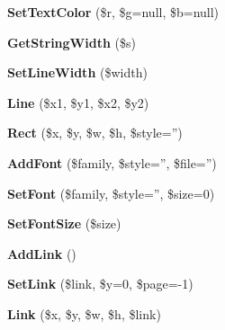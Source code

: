 \begin{DoxyCompactItemize}
\item 
\hypertarget{classFPDF_a59f12883ff2b60013eb0fe2c8c7e2dd5}{{\bfseries Set\+Text\+Color} (\$r, \$g=null, \$b=null)}\label{classFPDF_a59f12883ff2b60013eb0fe2c8c7e2dd5}

\item 
\hypertarget{classFPDF_a55c99f3416c3788c759249b6315c948a}{{\bfseries Get\+String\+Width} (\$s)}\label{classFPDF_a55c99f3416c3788c759249b6315c948a}

\item 
\hypertarget{classFPDF_ac8e8290a814b06303c1dfff06ee24acb}{{\bfseries Set\+Line\+Width} (\$width)}\label{classFPDF_ac8e8290a814b06303c1dfff06ee24acb}

\item 
\hypertarget{classFPDF_a408bfb653ed942e1e00d80ea9cdc139b}{{\bfseries Line} (\$x1, \$y1, \$x2, \$y2)}\label{classFPDF_a408bfb653ed942e1e00d80ea9cdc139b}

\item 
\hypertarget{classFPDF_af6b45f243c32ec04f1be28823b0cf15c}{{\bfseries Rect} (\$x, \$y, \$w, \$h, \$style='')}\label{classFPDF_af6b45f243c32ec04f1be28823b0cf15c}

\item 
\hypertarget{classFPDF_a7bfe3e0ed15ed966d8c41e36fb16553c}{{\bfseries Add\+Font} (\$family, \$style='', \$file='')}\label{classFPDF_a7bfe3e0ed15ed966d8c41e36fb16553c}

\item 
\hypertarget{classFPDF_a82acf7b1322a634829b56bb209045e1c}{{\bfseries Set\+Font} (\$family, \$style='', \$size=0)}\label{classFPDF_a82acf7b1322a634829b56bb209045e1c}

\item 
\hypertarget{classFPDF_a47d041deb672f69250c936a234eead14}{{\bfseries Set\+Font\+Size} (\$size)}\label{classFPDF_a47d041deb672f69250c936a234eead14}

\item 
\hypertarget{classFPDF_aa4784e97caa10d7b5bd5b37cdb8de523}{{\bfseries Add\+Link} ()}\label{classFPDF_aa4784e97caa10d7b5bd5b37cdb8de523}

\item 
\hypertarget{classFPDF_ab0137580cd5c01b4a48f4aec276706d4}{{\bfseries Set\+Link} (\$link, \$y=0, \$page=-\/1)}\label{classFPDF_ab0137580cd5c01b4a48f4aec276706d4}

\item 
\hypertarget{classFPDF_a50de51eae9ed1dab3a448491fcbbdde5}{{\bfseries Link} (\$x, \$y, \$w, \$h, \$link)}\label{classFPDF_a50de51eae9ed1dab3a448491fcbbdde5}


\end{DoxyCompactItemize}

